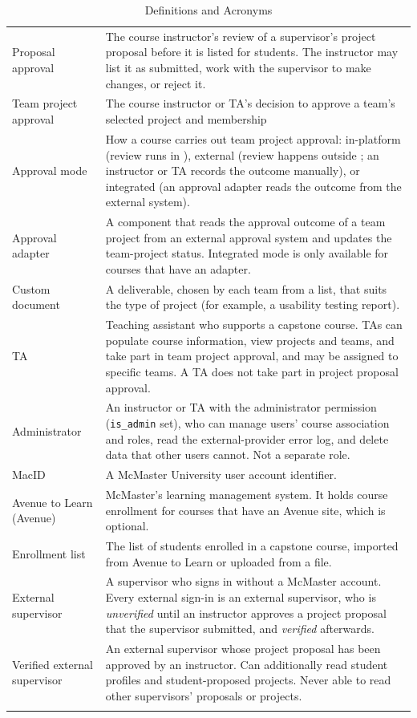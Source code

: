 \documentclass[12pt]{article}
\newcounter{tin}
\begin{document}
\begin{longtable}{p{} p{}}
    Proposal approval & The course instructor's review of a supervisor's project proposal before it is
    listed for students. The instructor may list it as submitted, work with the supervisor to make changes, or
    reject it. \\
    Team project approval & The course instructor or TA's decision to approve a team's selected project
    and membership \\
    Approval mode & How a course carries out team project approval: in-platform (review runs in \projname{}), external (review happens outside \projname{}; an instructor or TA records the outcome manually), or integrated (an approval adapter reads the outcome from the external system).\\
    Approval adapter & A component that reads the approval outcome of a team project from an external approval system and updates the team-project status. Integrated mode is only available for courses that have an adapter.\\
    Custom document & A deliverable, chosen by each team from a list, that suits the type of project
    (for example, a usability testing report).\\
    TA & Teaching assistant who supports a capstone course. TAs can populate course information, view projects and teams, and take part in team project approval, and may be assigned to specific teams. A TA does not take part in project proposal approval.\\
    Administrator & An instructor or TA with the administrator permission (\texttt{is\_admin} set), who can manage users' course association and roles, read the external-provider error log, and delete data that other users cannot. Not a separate role.\\
    MacID & A McMaster University user account identifier.\\
    Avenue to Learn (Avenue) & McMaster's learning management system. It holds course enrollment for courses that have
    an Avenue site, which is optional. \\
    Enrollment list & The list of students enrolled in a capstone course, imported from Avenue to Learn or uploaded from a
    file. \\
    External supervisor & A supervisor who signs in without a McMaster account. Every external sign-in is an
    external supervisor, who is \emph{unverified} until an instructor approves a project proposal that the supervisor submitted, and \emph{verified} afterwards.\\
    Verified external supervisor & An external supervisor whose project proposal has been approved by an instructor.
    Can additionally read student profiles and student-proposed projects.
    Never able to read other supervisors' proposals or projects.\\
    \bottomrule
    \caption{Definitions and Acronyms} \label{tab:DefinitionsAndAcronyms}
  \end{longtable}
\end{document}
